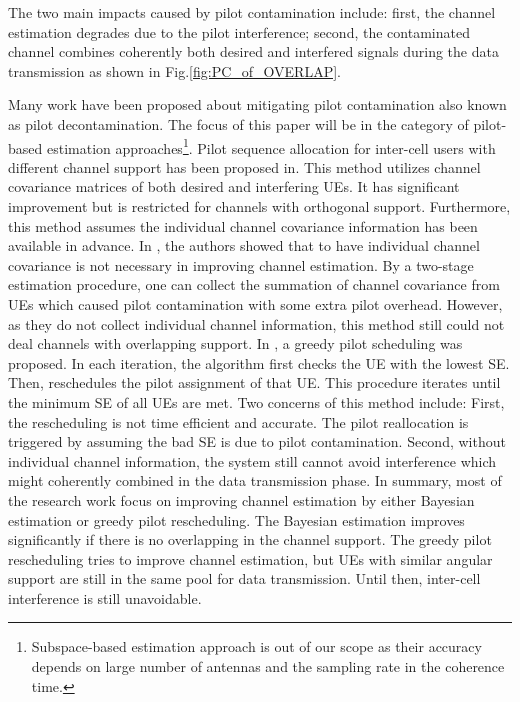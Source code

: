 The two main impacts caused by pilot contamination include: first, the channel estimation degrades due to the pilot interference; second, the contaminated channel combines coherently both desired and interfered signals during the data transmission as shown in Fig.\ref{fig:PC_of_OVERLAP}. 

Many work have been proposed about mitigating pilot contamination also known as pilot decontamination. The focus of this paper will be in the category of pilot-based estimation approaches\cite{elijah2016comprehensive}\footnote{Subspace-based estimation approach is out of our scope as their accuracy depends on large number of antennas and the sampling rate in the coherence time.}. Pilot sequence allocation for inter-cell users with different channel support has been proposed in\cite{yin2013coordinated,adhikary2013joint,you2015pilot}. This method utilizes channel covariance matrices of both desired and interfering UEs. It has significant improvement but is restricted for channels with orthogonal support. Furthermore, this method assumes the individual channel covariance information has been available in advance.  In \cite{bjornson2016massive}, the authors showed that to have individual channel covariance is not necessary in improving channel estimation. By a two-stage estimation procedure, one can collect the summation of channel covariance from UEs which caused pilot contamination with some extra pilot overhead. However, as they do not collect individual channel information, this method still could not deal channels with overlapping support. In \cite{ngo2017cell}, a greedy pilot scheduling was proposed. In each iteration, the algorithm first checks the UE with the lowest SE. Then, reschedules the pilot assignment of that UE. This procedure iterates until the minimum SE of all UEs are met. Two concerns of this method include: First, the rescheduling is not time efficient and accurate. The pilot reallocation is triggered by assuming the bad SE is due to pilot contamination. Second, without individual channel information, the system still cannot avoid interference which might coherently combined in the data transmission phase. In summary, most of the research work focus on improving channel estimation by either Bayesian estimation or greedy pilot rescheduling. The Bayesian estimation improves significantly if there is no overlapping in the channel support. The greedy pilot rescheduling tries to improve channel estimation, but UEs with similar angular support are still in the same pool for data transmission. Until then, inter-cell interference is still unavoidable.

